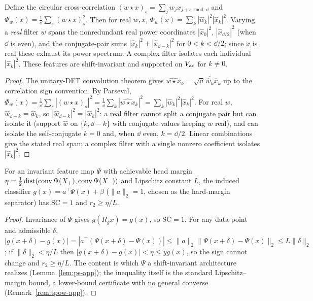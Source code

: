 \begin{lemma}\label{lem:ps-app}
Define the circular cross-correlation $(w\star x)_s=\sum_jw_jx_{j+s\bmod\dd}$ and
$\Phi_w(x)=\tfrac1\dd\sum_s(w\star x)_s^2$. Then for real $w,x$,
$\Phi_w(x)=\sum_k|\hat w_k|^2|\hat x_k|^2$. Varying a \emph{real} filter $w$
spans the nonredundant real power coordinates $|\hat x_0|^2$, $|\hat x_{\dd/2}|^2$
(when $\dd$ is even), and the conjugate-pair sums
$|\hat x_k|^2+|\hat x_{\dd-k}|^2$ for $0<k<\dd/2$; since $x$ is real these exhaust
its power spectrum. A complex filter isolates each individual $|\hat x_k|^2$.
These features are shift-invariant and supported on $V_{\mathrm{ac}}$ for $k\neq0$.
\end{lemma}
\begin{proof}
The unitary-DFT convolution theorem gives
$\widehat{w\star x}_k=\sqrt\dd\,\overline{\hat w_k}\hat x_k$ up to the correlation
sign convention. By Parseval,
$\Phi_w(x)=\tfrac1\dd\sum_s|(w\star x)_s|^2=\tfrac1\dd\sum_k|\widehat{w\star x}_k|^2
=\sum_k|\hat w_k|^2|\hat x_k|^2$. For real $w$, $\hat w_{\dd-k}=\overline{\hat w_k}$,
so $|\hat w_{\dd-k}|^2=|\hat w_k|^2$: a real filter cannot split a conjugate pair
but can isolate it (support $\hat w$ on $\{k,\dd-k\}$ with conjugate values
keeping $w$ real), and can isolate the self-conjugate $k=0$ and, when $\dd$ even,
$k=\dd/2$. Linear combinations give the stated real span; a complex filter with a
single nonzero coefficient isolates $|\hat x_k|^2$.
\end{proof}

\begin{corollary}\label{cor:C-app}
For an invariant feature map $\Psi$ with achievable head margin
$\eta=\tfrac12\operatorname{dist}(\operatorname{conv}\Psi(X_+),\operatorname{conv}\Psi(X_-))$ and Lipschitz constant $L$,
the induced classifier $g(x)=a^\top\Psi(x)+\beta$ ($\lVert a\rVert_2=1$, chosen as
the hard-margin separator) has $\mathrm{SC}=1$ and $r_2\ge\eta/L$.
\end{corollary}
\begin{proof}
Invariance of $\Psi$ gives $g(R_gx)=g(x)$, so $\mathrm{SC}=1$. For any data point
and admissible $\delta$,
$|g(x+\delta)-g(x)|=|a^\top(\Psi(x+\delta)-\Psi(x))|\le\lVert a\rVert_2\lVert\Psi(x+\delta)-\Psi(x)\rVert_2\le L\lVert\delta\rVert_2$;
if $\lVert\delta\rVert_2<\eta/L$ then $|g(x+\delta)-g(x)|<\eta\le yg(x)$, so the
sign cannot change and $r_2\ge\eta/L$. The content is which $\Psi$ a
shift-invariant architecture realizes (Lemma~\ref{lem:ps-app}); the inequality
itself is the standard Lipschitz--margin bound, a lower-bound certificate with no
general converse (Remark~\ref{rem:tpow-app}).
\end{proof}

